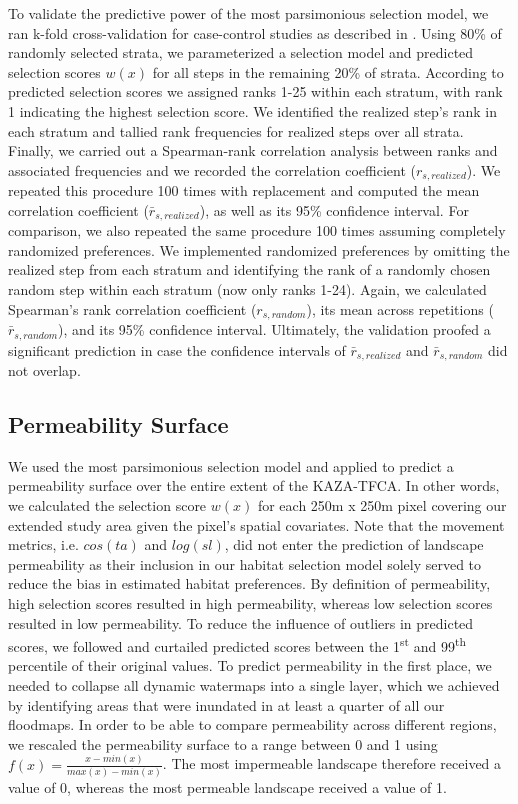 \documentclass[abstract=on,10pt,a4paper,bibliography=totocnumbered]{scrartcl}
\begin{document}
To validate the predictive power of the most parsimonious selection model, we
ran k-fold cross-validation for case-control studies as described in
\cite{Fortin.2009}. Using 80\% of randomly selected strata, we parameterized a
selection model and predicted selection scores \(w(x)\) for all steps in the
remaining 20\% of strata. According to predicted selection scores we assigned
ranks 1-25 within each stratum, with rank 1 indicating the highest selection
score. We identified the realized step's rank in each stratum and tallied rank
frequencies for realized steps over all strata. Finally, we carried out a
Spearman-rank correlation analysis between ranks and associated frequencies and
we recorded the correlation coefficient (\(r_{s, realized}\)). We repeated this
procedure 100 times with replacement and computed the mean correlation
coefficient (\(\bar{r}_{s, realized}\)), as well as its 95\% confidence
interval. For comparison, we also repeated the same procedure 100 times assuming
completely randomized preferences. We implemented randomized preferences by
omitting the realized step from each stratum and identifying the rank of a
randomly chosen random step within each stratum (now only ranks 1-24). Again, we
calculated Spearman's rank correlation coefficient (\(r_{s, random}\)), its mean
across repetitions (\(\bar{r}_{s, random}\)), and its 95\% confidence interval.
Ultimately, the validation proofed a significant prediction in case the
confidence intervals of \(\bar{r}_{s, realized}\) and \(\bar{r}_{s, random}\)
did not overlap.

\subsection{Permeability Surface}
We used the most parsimonious selection model and applied  to predict
a permeability surface over the entire extent of the KAZA-TFCA. In other words,
we calculated the selection score \(w(x)\) for each 250m x 250m pixel covering
our extended study area given the pixel's spatial covariates. Note that the
movement metrics, i.e. \(cos(ta)\) and \(log(sl)\), did not enter the prediction
of landscape permeability as their inclusion in our habitat selection model
solely served to reduce the bias in estimated habitat preferences. By definition
of permeability, high selection scores resulted in high permeability, whereas
low selection scores resulted in low permeability. To reduce the influence of
outliers in predicted scores, we followed \cite{Squires.2013} and curtailed
predicted scores between the 1\textsuperscript{st} and 99\textsuperscript{th}
percentile of their original values. To predict permeability in the first place,
we needed to collapse all dynamic watermaps into a single layer, which we
achieved by identifying areas that were inundated in at least a quarter of all
our floodmaps. In order to be able to compare permeability across different
regions, we rescaled the permeability surface to a range between 0 and 1 using
\(f(x) = \frac{x - min(x)}{max(x) - min(x)}\). The most impermeable landscape
therefore received a value of 0, whereas the most permeable landscape received a
value of 1.
\end{document}
